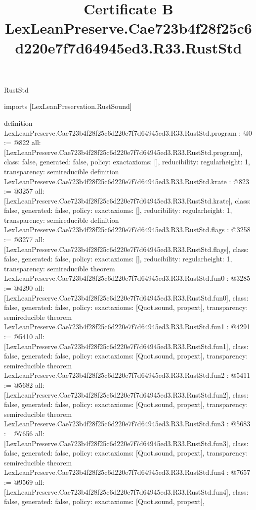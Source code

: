 \begin{lexlean}{RustStd}
\title{Certificate B LexLeanPreserve.Cae723b4f28f25c6d220e7f7d64945ed3.R33.RustStd}
\begin{coremodule}
imports [LexLeanPreservation.RustSound]

definition LexLeanPreserve.Cae723b4f28f25c6d220e7f7d64945ed3.R33.RustStd.program : @0 := @822 {
  all: [LexLeanPreserve.Cae723b4f28f25c6d220e7f7d64945ed3.R33.RustStd.program],
  class: false,
  generated: false,
  policy: exact{axioms: []},
  reducibility: regular{height: 1},
  transparency: semireducible
}
definition LexLeanPreserve.Cae723b4f28f25c6d220e7f7d64945ed3.R33.RustStd.krate : @823 := @3257 {
  all: [LexLeanPreserve.Cae723b4f28f25c6d220e7f7d64945ed3.R33.RustStd.krate],
  class: false,
  generated: false,
  policy: exact{axioms: []},
  reducibility: regular{height: 1},
  transparency: semireducible
}
definition LexLeanPreserve.Cae723b4f28f25c6d220e7f7d64945ed3.R33.RustStd.flags : @3258 := @3277 {
  all: [LexLeanPreserve.Cae723b4f28f25c6d220e7f7d64945ed3.R33.RustStd.flags],
  class: false,
  generated: false,
  policy: exact{axioms: []},
  reducibility: regular{height: 1},
  transparency: semireducible
}
theorem LexLeanPreserve.Cae723b4f28f25c6d220e7f7d64945ed3.R33.RustStd.fun0 : @3285 := @4290 {
  all: [LexLeanPreserve.Cae723b4f28f25c6d220e7f7d64945ed3.R33.RustStd.fun0],
  class: false,
  generated: false,
  policy: exact{axioms: [Quot.sound, propext]},
  transparency: semireducible
}
theorem LexLeanPreserve.Cae723b4f28f25c6d220e7f7d64945ed3.R33.RustStd.fun1 : @4291 := @5410 {
  all: [LexLeanPreserve.Cae723b4f28f25c6d220e7f7d64945ed3.R33.RustStd.fun1],
  class: false,
  generated: false,
  policy: exact{axioms: [Quot.sound, propext]},
  transparency: semireducible
}
theorem LexLeanPreserve.Cae723b4f28f25c6d220e7f7d64945ed3.R33.RustStd.fun2 : @5411 := @5682 {
  all: [LexLeanPreserve.Cae723b4f28f25c6d220e7f7d64945ed3.R33.RustStd.fun2],
  class: false,
  generated: false,
  policy: exact{axioms: [Quot.sound, propext]},
  transparency: semireducible
}
theorem LexLeanPreserve.Cae723b4f28f25c6d220e7f7d64945ed3.R33.RustStd.fun3 : @5683 := @7656 {
  all: [LexLeanPreserve.Cae723b4f28f25c6d220e7f7d64945ed3.R33.RustStd.fun3],
  class: false,
  generated: false,
  policy: exact{axioms: [Quot.sound, propext]},
  transparency: semireducible
}
theorem LexLeanPreserve.Cae723b4f28f25c6d220e7f7d64945ed3.R33.RustStd.fun4 : @7657 := @9569 {
  all: [LexLeanPreserve.Cae723b4f28f25c6d220e7f7d64945ed3.R33.RustStd.fun4],
  class: false,
  generated: false,
  policy: exact{axioms: [Quot.sound, propext]},
}
\end{coremodule}
\end{lexlean}
